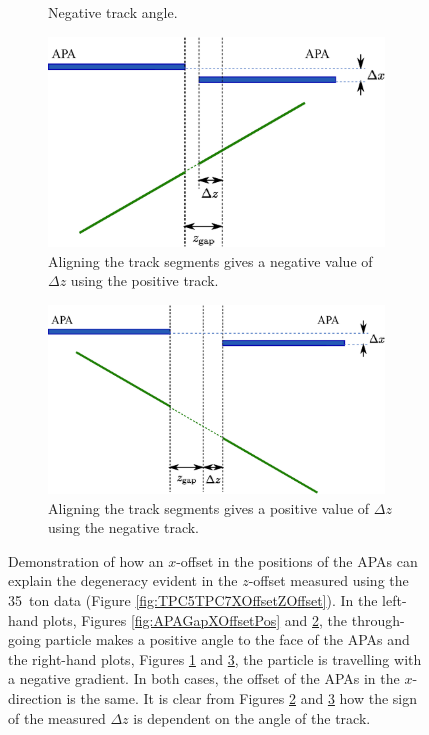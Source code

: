 \begin{figure}[p]
\begin{subfigure}[t]{0.48\linewidth}
    \caption{Negative track angle.}
    \label{fig:APAGapXOffsetNeg}
  \end{subfigure}
  \vfill
  \begin{subfigure}[t]{0.48\linewidth}
    \centering
    \includegraphics[width=0.98\textwidth]{apa_gap_xoffset_pos_fix.eps}
    \caption{Aligning the track segments gives a negative value of $\Delta z$ using the positive track.}
    \label{fig:APAGapXOffsetPosFix}
  \end{subfigure}
  \hfill
  \begin{subfigure}[t]{0.48\linewidth}
    \centering
    \includegraphics[width=0.98\textwidth]{apa_gap_xoffset_neg_fix.eps}
    \caption{Aligning the track segments gives a positive value of $\Delta z$ using the negative track.}
    \label{fig:APAGapXOffsetNegFix}
  \end{subfigure}
  \caption{Demonstration of how an $x$-offset in the positions of the APAs can explain the degeneracy evident in the $z$-offset measured using the 35~ton data (Figure \ref{fig:TPC5TPC7XOffsetZOffset}).  In the left-hand plots, Figures \ref{fig:APAGapXOffsetPos} and \ref{fig:APAGapXOffsetPosFix}, the through-going particle makes a positive angle to the face of the APAs and the right-hand plots, Figures \ref{fig:APAGapXOffsetNeg} and \ref{fig:APAGapXOffsetNegFix}, the particle is travelling with a negative gradient.  In both cases, the offset of the APAs in the $x$-direction is the same.  It is clear from Figures \ref{fig:APAGapXOffsetPosFix} and \ref{fig:APAGapXOffsetNegFix} how the sign of the measured $\Delta z$ is dependent on the angle of the track.}
  \label{fig:APAGapXOffset}
\end{figure}


